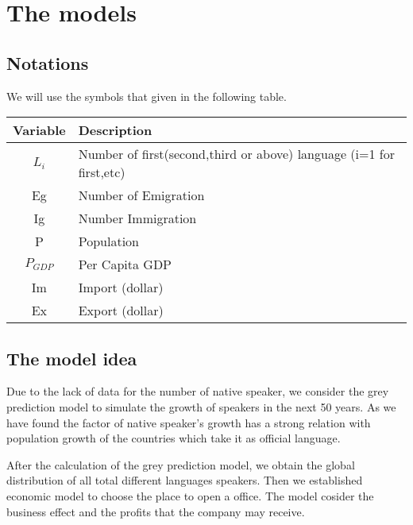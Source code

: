 \documentclass{mcmthesis}
\begin{document}
\section{The models}
\subsection{Notations}
We will use the symbols that given in the following table.
\begin{table}
\begin{center}
\begin{tabular}{c|l}
\hline
\multicolumn{1}{l}{Variable} & Description                                      \\
\hline
$L_i$                            & Number of first(second,third or above) language (i=1 for first,etc)                                       \\
Eg                           &Number of Emigration                                       \\
Ig                           &Number Immigration \\
P                            & Population                                \\
$P_{GDP}   $                         & Per Capita GDP                                   \\
Im                            & Import (dollar)                                       \\
Ex                            & Export (dollar)                                   \\
\hline
\end{tabular}
\end{center}
\end{table}
\subsection{The model idea}
\qquad Due to the lack of data for the number of native speaker, we consider the grey prediction model to simulate the growth of speakers in the next 50 years.
As we have found the factor of native speaker's growth has a strong relation with population growth of the countries which take it as official language.


After the calculation of the grey prediction model, we obtain the global distribution of all total different languages speakers. Then we established economic model to choose the place to open a office.
The model cosider the business effect and the profits that the company may receive.
\end{document}
